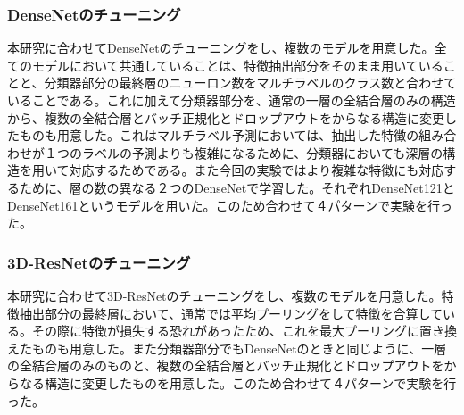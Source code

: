 \subsubsection{DenseNetのチューニング}
本研究に合わせてDenseNetのチューニングをし、複数のモデルを用意した。全てのモデルにおいて共通していることは、特徴抽出部分をそのまま用いていることと、分類器部分の最終層のニューロン数をマルチラベルのクラス数と合わせていることである。これに加えて分類器部分を、通常の一層の全結合層のみの構造から、複数の全結合層とバッチ正規化とドロップアウトをからなる構造に変更したものも用意した。これはマルチラベル予測においては、抽出した特徴の組み合わせが１つのラベルの予測よりも複雑になるために、分類器においても深層の構造を用いて対応するためである。また今回の実験ではより複雑な特徴にも対応するために、層の数の異なる２つのDenseNetで学習した。それぞれDenseNet121とDenseNet161というモデルを用いた。このため合わせて４パターンで実験を行った。
\subsubsection{3D-ResNetのチューニング}
本研究に合わせて3D-ResNetのチューニングをし、複数のモデルを用意した。特徴抽出部分の最終層において、通常では平均プーリングをして特徴を合算している。その際に特徴が損失する恐れがあったため、これを最大プーリングに置き換えたものも用意した。また分類器部分でもDenseNetのときと同じように、一層の全結合層のみのものと、複数の全結合層とバッチ正規化とドロップアウトをからなる構造に変更したものを用意した。このため合わせて４パターンで実験を行った。
